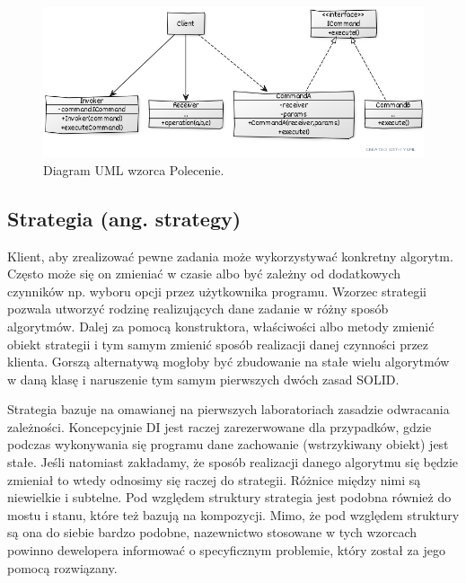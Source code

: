 \begin{figure}[hbt!]
	\centering
	\includegraphics[width=0.9\linewidth]{images/CommandUml}
	\caption{Diagram UML wzorca Polecenie.}
	\label{lab4/fig/CommandUml}
\end{figure}
%



\subsection{Strategia (ang. strategy)}

Klient, aby zrealizować pewne zadania może wykorzystywać konkretny algorytm. Często może się on zmieniać w czasie albo być zależny od dodatkowych czynników np. wyboru opcji przez użytkownika programu. Wzorzec strategii pozwala utworzyć rodzinę realizujących dane zadanie w różny sposób algorytmów. Dalej za pomocą konstruktora, właściwości albo metody zmienić obiekt strategii i tym samym zmienić sposób realizacji danej czynności przez klienta. Gorszą alternatywą mogłoby być zbudowanie na stałe wielu algorytmów w daną klasę i naruszenie tym samym pierwszych dwóch zasad SOLID. 

Strategia bazuje na omawianej na pierwszych laboratoriach zasadzie odwracania zależności. Koncepcyjnie DI jest raczej zarezerwowane dla przypadków, gdzie podczas wykonywania się programu dane zachowanie (wstrzykiwany obiekt) jest stałe. Jeśli natomiast zakładamy, że sposób realizacji danego algorytmu się będzie zmieniał to wtedy odnosimy się raczej do strategii. Różnice między nimi są niewielkie i subtelne. Pod względem struktury strategia jest podobna również do mostu i stanu, które też bazują na kompozycji. Mimo, że pod względem struktury są ona do siebie bardzo podobne, nazewnictwo stosowane w tych wzorcach powinno dewelopera informować o specyficznym problemie, który został za jego pomocą rozwiązany.

